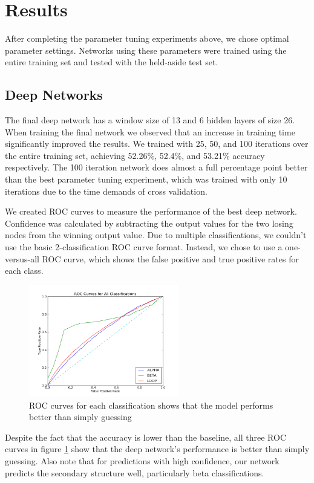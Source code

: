 \documentclass[letterpaper,twocolumn,12pt]{article}
\begin{document}
\section{Results}
After completing the parameter tuning experiments above, we chose optimal parameter settings.
Networks using these parameters were trained using the entire training set and tested with the held-aside test set.

\subsection{Deep Networks}
\label{subsec:deepnetresults}
The final deep network has a window size of 13 and 6 hidden layers of size 26.
When training the final network we observed that an increase in training time significantly improved the results. 
We trained with 25, 50, and 100 iterations over the entire training set, achieving 52.26\%, 52.4\%, and 53.21\% accuracy respectively.
The 100 iteration network does almost a full percentage point better than the best parameter tuning experiment, which was trained with only 10 iterations due to the time demands of cross validation.

We created ROC curves to measure the performance of the best deep network.
Confidence was calculated by subtracting the output values for the two losing nodes from the winning output value.
Due to multiple classifications, we couldn't use the basic 2-classification ROC curve format.
Instead, we chose to use a one-versus-all ROC curve, which shows the false positive and true positive rates for each class.

\begin{figure}[ht!]
\centering
\includegraphics[width=65mm]{results/ROC_all_final_deep_net_100it.png}
\caption{ROC curves for each classification shows that the model performs better than simply guessing}
\label{fig:roc}
\end{figure}

Despite the fact that the accuracy is lower than the baseline, all three ROC curves in figure \ref{fig:roc} show that the deep network's performance is better than simply guessing.
Also note that for predictions with high confidence, our network predicts the secondary structure well, particularly beta classifications.
\end{document}
